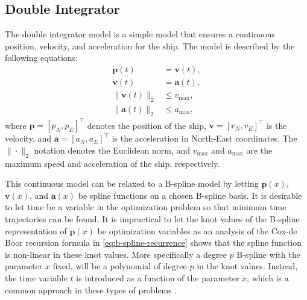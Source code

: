 \subsection{Double Integrator}\label{sec:double-integrator}
The double integrator model is a simple model that ensures a continuous position, velocity, and acceleration for the ship. The model is described by the following equations:
\begin{subequations}\label{eq:double-integrator}
    \begin{align}
        \dot{\mathbf{p}}(t) &= \mathbf{v}(t), \label{eq:double-integrator-x} \\
        \dot{\mathbf{v}}(t) &= \mathbf{a}(t), \label{eq:double-integrator-v} \\
        \|\mathbf{v}(t)\|_2 &\leq v_{\max}, \label{eq:double-integrator-vmax} \\
        \|\mathbf{a}(t)\|_2 &\leq a_{\max}, \label{eq:double-integrator-a}
    \end{align}
\end{subequations}
where $\mathbf{p} = [p_N, p_E]^\top$ denotes the position of the ship, $\mathbf{v} = [v_N, v_E]^\top$ is the velocity, and $\mathbf{a} = [a_N, a_E]^\top$ is the acceleration in North-East coordinates. The $\|\cdot\|_2$ notation denotes the Euclidean norm, and $v_{\max}$ and $a_{\max}$ are the maximum speed and acceleration of the ship, respectively.

This continuous model can be relaxed to a B-spline model by letting $\mathbf{p}(x)$, $\mathbf{v}(x)$, and $\mathbf{a}(x)$ be spline functions on a chosen B-spline basis. It is desirable to let time be a variable in the optimization problem so that minimum time trajectories can be found. It is impractical to let the knot values of the B-spline representation of $\mathbf{p}(x)$ be optimization variables as an analysis of the Cox-de Boor recursion formula in \cref{eq:b-spline-recurrence} shows that the spline function is non-linear in these knot values. More specifically a degree $p$ B-spline with the parameter $x$ fixed, will be a polynomial of degree $p$ in the knot values. Instead, the time variable $t$ is introduced as a function of the parameter $x$, which is a common approach in these types of problems \citep{mercy2017spline,ShortestPathsConvexSets}. 

